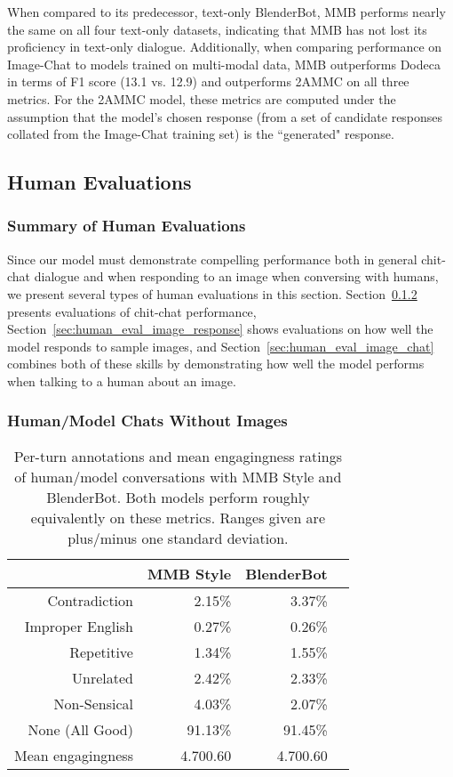 \documentclass[11pt,a4paper]{article}
\begin{document}
When compared to its predecessor, text-only BlenderBot, MMB performs nearly the same on all four text-only datasets, indicating that MMB has not lost its proficiency in text-only dialogue. Additionally, when comparing performance on Image-Chat to models trained on multi-modal data, MMB outperforms Dodeca in terms of F1 score (13.1 vs. 12.9) and outperforms 2AMMC on all three metrics. For the 2AMMC model, these metrics are computed under the assumption that the model's chosen response (from a set of candidate responses collated from the Image-Chat training set) is the ``generated" response.

\subsection{Human Evaluations}

\subsubsection{Summary of Human Evaluations}

Since our model must demonstrate compelling performance both in general chit-chat dialogue and when responding to an image when conversing with humans, we present several types of human evaluations in this section. Section~\ref{sec:human_eval_chat_no_image} presents evaluations of chit-chat performance, Section~\ref{sec:human_eval_image_response} shows evaluations on how well the model responds to sample images, and Section~\ref{sec:human_eval_image_chat} combines both of these skills by demonstrating how well the model performs when talking to a human about an image.

\subsubsection{Human/Model Chats Without Images}
\label{sec:human_eval_chat_no_image}

\begin{table}[t!]
\begin{center}
\small
\centering
\begin{tabular}{r|rrr}
\hline
& MMB Style & BlenderBot \\
\hline
Contradiction & 2.15\% & 3.37\% \\
Improper English & 0.27\% & 0.26\% \\
Repetitive & 1.34\% & 1.55\% \\
Unrelated & 2.42\% & 2.33\% \\
Non-Sensical & 4.03\% & 2.07\% \\
None (All Good) & 91.13\% & 91.45\% \\
\hline
Mean engagingness & 4.700.60 & 4.700.60 \\
\hline
\end{tabular}
\caption{Per-turn annotations and mean engagingness ratings of human/model conversations with MMB Style and BlenderBot. Both models perform roughly equivalently on these metrics. Ranges given are plus/minus one standard deviation.
\label{table:q_func_ratings}
}
\end{center}
\end{table}
\end{document}
